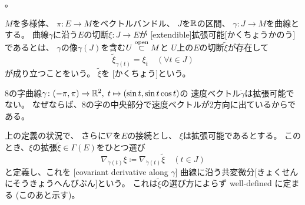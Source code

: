 \documentclass[report]{jlreq}
\begin{document}
。

\begin{definition}[曲線に沿う切断の拡張可能性]
    $M$を多様体、
    $\pi \colon E \to M$をベクトルバンドル、
    $J$を$\mathbb{R}$の区間、
    $\gamma \colon J \to M$を{\smooth}曲線とする。
    曲線$\gamma$に沿う$E$の切断$\xi \colon J \to E$が
    [extendible]{拡張可能}[かくちょうかのう]
    であるとは、
    $\gamma$の像$\gamma(J)$を含む$U \stackrel{\text{open}}{\subset} M$と
    $U$上の$E$の切断$\widetilde{\xi}$が存在して
    \begin{equation}
        \widetilde{\xi}_{\gamma(t)} = \xi_t
            \quad
            (\forall t \in J)
    \end{equation}
    が成り立つことをいう。
    $\widetilde{\xi}$を
    [かくちょう]という。
\end{definition}

\begin{example}[拡張可能でない例]
    8の字曲線$\gamma \colon (-\pi, \pi) \to \mathbb{R}^2, \;
    t \mapsto (\sin t, \sin t \cos t)$の
    速度ベクトル$\dot{\gamma}$は拡張可能でない。
    なぜならば、8の字の中央部分で速度ベクトルが2方向に出ているからである。
\end{example}

\begin{definition}[曲線に沿う共変微分]
    上の定義の状況で、
    さらに$\nabla$を$E$の接続とし、
    $\xi$は拡張可能であるとする。
    このとき、$\xi$の拡張$\widetilde{\xi} \in \Gamma(E)$をひとつ選び
    \begin{equation}
        \nabla_{\dot{\gamma}(t)} \xi
            \coloneqq \nabla_{\dot{\gamma}(t)} \widetilde{\xi}
            \quad
            (t \in J)
    \end{equation}
    と定義し、これを
    [covariant derivative along $\gamma$]
    {曲線に沿う共変微分}[きょくせんにそうきょうへんびぶん]という。
    これは$\widetilde{\xi}$の選び方によらず well-defined に定まる (このあと示す)。
\end{definition}
\end{document}
